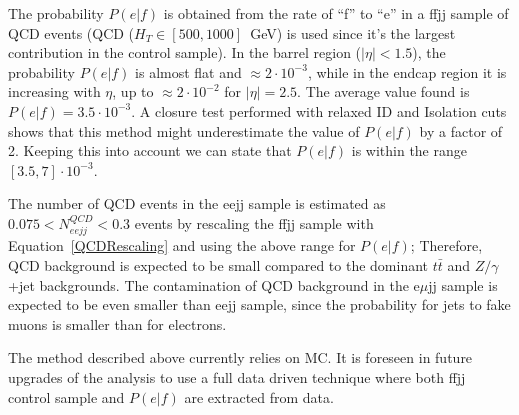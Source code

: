 The probability $P(e|f)$ is obtained from the rate of ``f'' to ``e'' in a ffjj sample of QCD events 
(QCD ($H_T\in[500,1000]$~GeV) is used since it's the largest contribution in the control sample).
In the barrel region ($|\eta|<1.5$), the probability $P(e|f)$ is almost flat and $\approx 2 \cdot 10^{-3}$,  
while in the endcap region it is increasing with $\eta$, up to $\approx 2 \cdot 10^{-2}$ 
for $|\eta|=2.5$. The average value found is $P(e|f) = 3.5 \cdot 10^{-3}$.
A closure test performed with relaxed ID and Isolation cuts shows 
that this method might underestimate the value of $P(e|f)$ by a factor of 2.
Keeping this into account we can state that $P(e|f)$ is within the range
$[3.5,7] \cdot 10^{-3}$.


The number of QCD events in the eejj sample is estimated as 
$0.075<N_{eejj}^{QCD}<0.3$ events by rescaling the ffjj sample 
with Equation~\ref{QCDRescaling} and using the above range for $P(e|f)$; 
Therefore, QCD background is expected to be small compared to 
the dominant $t\bar{t}$ and $Z/\gamma$+jet backgrounds.
The contamination of QCD background in the e$\mu$jj sample 
is expected to be even smaller than eejj sample, since the probability for jets to fake muons 
is smaller than for electrons. %

The method described above currently relies on MC. 
It is foreseen in future upgrades of the analysis to use a full data driven technique where 
both ffjj control sample and $P(e|f)$ are extracted from data. 

%
